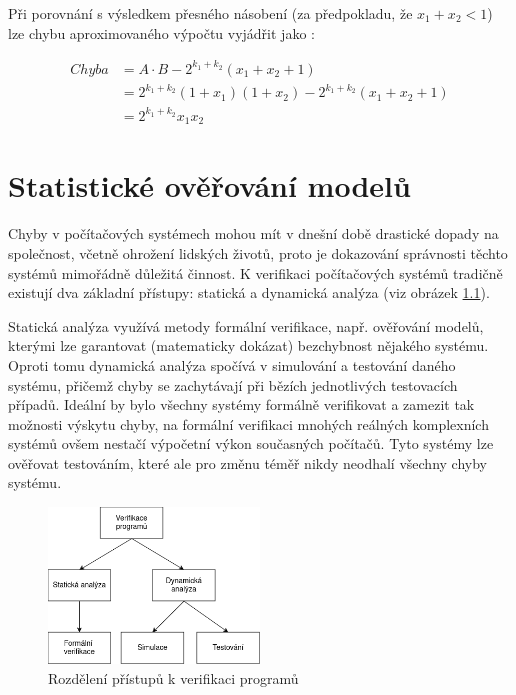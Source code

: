 Při porovnání s výsledkem přesného násobení (za předpokladu, že $x_1 + x_2 < 1$) lze chybu aproximovaného výpočtu vyjádřit jako \cite{approx_mult_survey}:

\begin{equation}
    \begin{array}{rl}
       Chyba & = A \cdot B - 2^{k_1+k_2}(x_1+x_2+1) \\
             & = 2^{k_1+k_2}(1+x_1)(1+x_2)-2^{k_1+k_2}(x_1+x_2+1) \\
             & = 2^{k_1+k_2}x_1x_2
    \end{array}
\end{equation}

\chapter{Statistické ověřování modelů}
\label{smc}
Chyby v počítačových systémech mohou mít v dnešní době drastické dopady na společnost, včetně ohrožení lidských životů, proto je dokazování správnosti těchto systémů mimořádně důležitá činnost. K verifikaci počítačových systémů tradičně existují dva základní přístupy: statická a dynamická analýza (viz obrázek \ref{fig:verifikace_rozdeleni}).

Statická analýza využívá metody formální verifikace, např. ověřování modelů, kterými lze garantovat (matematicky dokázat) bezchybnost nějakého systému. Oproti tomu dynamická analýza spočívá v simulování a testování daného systému, přičemž chyby se zachytávají při bězích jednotlivých testovacích případů. Ideální by bylo všechny systémy formálně verifikovat a zamezit tak možnosti výskytu chyby, na formální verifikaci mnohých reálných komplexních systémů ovšem nestačí výpočetní výkon současných počítačů. Tyto systémy lze ověřovat testováním, které ale pro změnu téměř nikdy neodhalí všechny chyby systému.

\begin{figure}[H]
    \centering
    \includegraphics[width=0.5\textwidth]{obrazky-figures/verifikace_rozdeleni.png}
    \caption{Rozdělení přístupů k verifikaci programů}
    \label{fig:verifikace_rozdeleni}
\end{figure}


